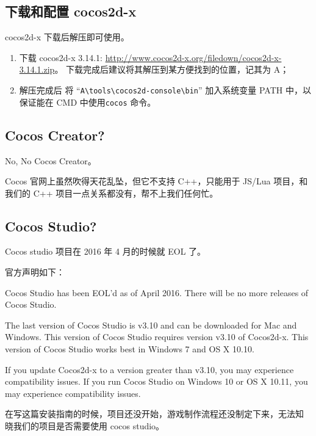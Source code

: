 \documentclass[a4paper, 10pt]{article}
\begin{document}
\subsection{下载和配置 cocos2d-x}

cocos2d-x 下载后解压即可使用。

\begin{enumerate}
\item 下载 cocos2d-x 3.14.1:
  \url{http://www.cocos2d-x.org/filedown/cocos2d-x-3.14.1.zip}。
  下载完成后建议将其解压到某方便找到的位置，记其为 A；

\item 解压完成后
  将
  ``\texttt{A\textbackslash{}tools\textbackslash{}cocos2d-console\textbackslash{}bin}''
  加入系统变量 PATH 中，以保证能在 CMD 中使用\texttt{cocos} 命令。
\end{enumerate}

\subsection{Cocos Creator?}

No, No Cocos Creator。

Cocos 官网上虽然吹得天花乱坠，但它不支持 C++，只能用于 JS/Lua 项目，和
我们的 C++ 项目一点关系都没有，帮不上我们任何忙。

\subsection{Cocos Studio?}

Cocos studio 项目在 2016 年 4 月的时候就 EOL 了。

官方声明如下：

\begin{shaded}
Cocos Studio has been EOL'd as of April 2016. There will be no more
releases of Cocos Studio.

The last version of Cocos Studio is v3.10 and can be downloaded for
Mac and Windows. This version of Cocos Studio requires version v3.10
of Cocos2d-x. This version of Cocos Studio works best in Windows 7 and
OS X 10.10.

If you update Cocos2d-x to a version greater than v3.10, you may
experience compatibility issues. If you run Cocos Studio on Windows 10
or OS X 10.11, you may experience compatibility issues.
\end{shaded}

在写这篇安装指南的时候，项目还没开始，游戏制作流程还没制定下来，无法知
晓我们的项目是否需要使用 cocos studio。
\end{document}
